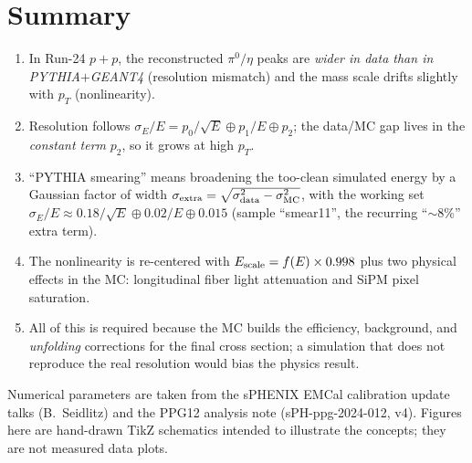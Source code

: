 \documentclass[11pt]{article}
\begin{document}
\section{Summary}
\begin{enumerate}[nosep]
  \item In Run-24 $p{+}p$, the reconstructed $\pi^0/\eta$ peaks are
        \emph{wider in data than in PYTHIA$+$GEANT4} (resolution mismatch) and
        the mass scale drifts slightly with $p_T$ (nonlinearity).
  \item Resolution follows
        $\sigma_E/E=p_0/\sqrt{E}\oplus p_1/E\oplus p_2$; the data/MC gap lives in
        the \emph{constant term} $p_2$, so it grows at high $p_T$.
  \item ``PYTHIA smearing'' means broadening the too-clean simulated energy by a
        Gaussian factor of width
        $\sigma_{\rm extra}=\sqrt{\sigma_{\rm data}^2-\sigma_{\rm MC}^2}$, with
        the working set $\sigma_E/E\approx0.18/\sqrt{E}\oplus0.02/E\oplus0.015$
        (sample ``smear11'', the recurring ``$\sim$8\%'' extra term).
  \item The nonlinearity is re-centered with $E_{\rm scale}=f(E)\times0.998$ plus
        two physical effects in the MC: longitudinal fiber light attenuation and
        SiPM pixel saturation.
  \item All of this is required because the MC builds the efficiency,
        background, and \emph{unfolding} corrections for the final cross section;
        a simulation that does not reproduce the real resolution would bias the
        physics result.
\end{enumerate}

\bigskip
\noindent\footnotesize Numerical parameters are taken from the sPHENIX EMCal
calibration update talks (B.~Seidlitz) and the PPG12 analysis note
(sPH-ppg-2024-012, v4). Figures here are hand-drawn TikZ schematics intended to
illustrate the concepts; they are not measured data plots.
\end{document}
